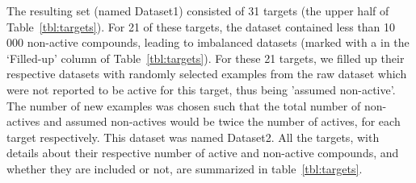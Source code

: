 \documentclass[10pt,article]{memoir}
\begin{document}
The resulting set (named Dataset1) consisted of 31 targets (the upper half of Table~\ref{tbl:targets}).
For 21 of these targets, the dataset contained less than 10\,000 non-active
compounds, leading to imbalanced datasets (marked with a \checkmark in the
`Filled-up' column of Table~\ref{tbl:targets}).
%
For these 21 targets, we filled up their respective datasets with randomly
selected examples from the raw dataset which were not reported to be active for
this target, thus being 'assumed non-active'. The number of new examples was chosen such that the total number of non-actives and
assumed non-actives would be twice the number of actives, for each target
respectively. This dataset was named Dataset2.
%
All the targets, with details about their respective number of active
and non-active compounds, and whether they are included or not, are summarized
in table~\ref{tbl:targets}.
\end{document}

